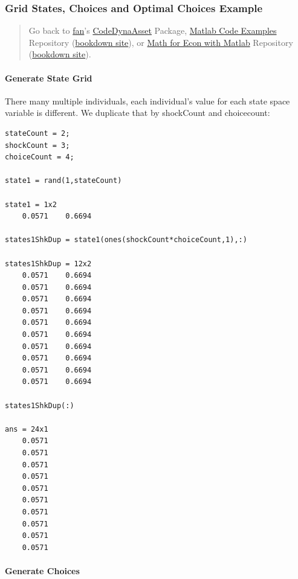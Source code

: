 \documentclass[
]{book}
\begin{document}
\hypertarget{grid-states-choices-and-optimal-choices-example}{%
\subsubsection{Grid States, Choices and Optimal Choices Example}\label{grid-states-choices-and-optimal-choices-example}}

\begin{quote}
Go back to \href{http://fanwangecon.github.io/}{fan}'s \href{https://fanwangecon.github.io/CodeDynaAsset/}{CodeDynaAsset} Package, \href{https://fanwangecon.github.io/M4Econ/}{Matlab Code Examples} Repository (\href{https://fanwangecon.github.io/M4Econ/bookdown}{bookdown site}), or \href{https://fanwangecon.github.io/Math4Econ/}{Math for Econ with Matlab} Repository (\href{https://fanwangecon.github.io/Math4Econ/bookdown}{bookdown site}).
\end{quote}

\hypertarget{generate-state-grid}{%
\paragraph{\texorpdfstring{\textbf{Generate State Grid}}{Generate State Grid}}\label{generate-state-grid}}

There many multiple individuals, each individual's value for each state
space variable is different. We duplicate that by shockCount and
choicecount:

\begin{verbatim}
stateCount = 2;
shockCount = 3;
choiceCount = 4;

state1 = rand(1,stateCount)

state1 = 1x2    
    0.0571    0.6694

states1ShkDup = state1(ones(shockCount*choiceCount,1),:)

states1ShkDup = 12x2    
    0.0571    0.6694
    0.0571    0.6694
    0.0571    0.6694
    0.0571    0.6694
    0.0571    0.6694
    0.0571    0.6694
    0.0571    0.6694
    0.0571    0.6694
    0.0571    0.6694
    0.0571    0.6694

states1ShkDup(:)

ans = 24x1    
    0.0571
    0.0571
    0.0571
    0.0571
    0.0571
    0.0571
    0.0571
    0.0571
    0.0571
    0.0571
\end{verbatim}

\hypertarget{generate-choices}{%
\paragraph{\texorpdfstring{\textbf{Generate Choices}}{Generate Choices}}\label{generate-choices}}
\end{document}
